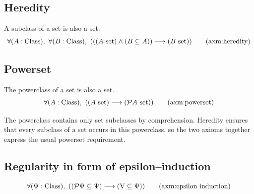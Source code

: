 \subsection{Heredity}
\begin{axiom}[heredity]
A subclass of a set is also a set.
\[
\forall (A:\Class),\ %
\forall (B:\Class),\ %
(
(
(A\set)
\land
(B\subseteq A)
)
\implies
(B\set)
)
\labeltagd{axm}{heredity}
\]%
\end{axiom}
\subsection{Powerset}
\begin{axiom}[powerset]
The powerclass of a set is also a set.
\[
\forall (A:\Class),\ %
(
(A\set)
\implies
(\power A\set)
)
\labeltagd{axm}{powerset}
\]
\end{axiom}
\begin{note}
The powerclass contains only set subclasses by comprehension. Heredity ensures that every subclass of a set occurs in this powerclass, so the two axioms together express the usual powerset requirement.
\end{note}

\subsection{Regularity in form of epsilon--induction}
\begin{axiom}[$\in$--induction]

\[
\forall (\Psi:\Class),\ %
((\power\Psi\subseteq\Psi)\implies(\V\subseteq\Psi))
\labeltagd{axm}{epsilon induction}
\]
\end{axiom}


